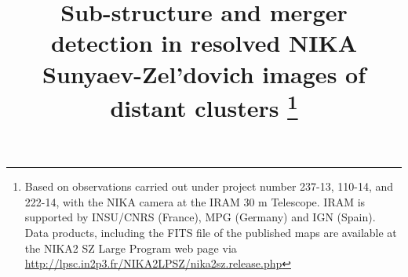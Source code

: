 \documentclass[twocolumn,traditabstract]{aa}
\begin{document}
\title{Sub-structure and merger detection in resolved NIKA Sunyaev-Zel'dovich images of distant clusters \thanks{Based on observations carried out under project number 237-13, 110-14, and 222-14, with the NIKA camera at the IRAM 30 m Telescope. IRAM is supported by INSU/CNRS (France), MPG (Germany) and IGN (Spain). Data products, including the FITS file of the published maps are available at the NIKA2 SZ Large Program web page via \url{http://lpsc.in2p3.fr/NIKA2LPSZ/nika2sz.release.php}}}


\end{document}
